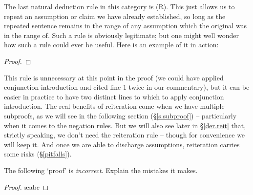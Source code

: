 The last natural deduction rule in this category is  (R). This just allows us to repeat an assumption or claim  we have already established, so long as the repeated sentence remains in the range of any assumption which the original was in the range of.
Such a rule is obviously legitimate; but one might well wonder how such a rule could ever be useful. Here is an example of it in action: \begin{proof}
\end{proof}
This rule is unnecessary at this point in the proof (we could have applied conjunction introduction and cited line 1 twice in our commentary), but it can be easier in practice to have two distinct lines to which to apply conjunction introduction. The real benefits of reiteration come when we have multiple subproofs, as we will see in the following section (§\ref{s.subproof}) – particularly when it comes to the negation rules. But we will also see later in §\ref{der.reit} that, strictly speaking, we don't need the reiteration rule – though for convenience we will keep it. And once we are able to discharge assumptions, reiteration carries some risks (§\ref{pitfalls}).


\practiceproblems
\problempart
The following `proof' is \emph{incorrect}. Explain the mistakes it makes.

\begin{proof}
\ae{abc}
\end{proof}

